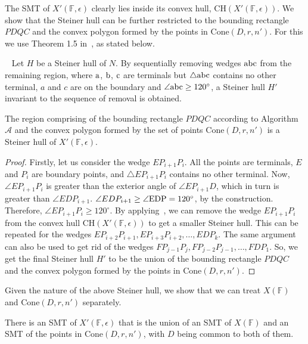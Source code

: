 The SMT of $X'(\mathbb{F},\epsilon)$ clearly lies inside its convex hull, $\mathrm{CH}(X'(\mathbb{F},\epsilon))$. We show that the Steiner hull can be further restricted to the bounding rectangle $PDQC$ and the convex polygon formed by the points in $\mathrm{Cone}(D,r,n')$. For this we use Theorem 1.5 in~\cite{hwang1992steiner}, as stated below.

\begin{proposition}~\cite{hwang1992steiner}\label{thm:steiner_hull}
    Let $H$ be a Steiner hull of $N$. By sequentially removing wedges $\rm abc$ from the remaining region, where $\rm a$, $\rm b$, $\rm c$ are terminals but $\triangle{\rm abc}$ contains no other terminal, $a$ and $c$ are on the boundary and $\angle{\rm abc} \geq 120^\circ$, a Steiner hull $H'$ invariant to the sequence of removal is obtained.
\end{proposition}

\begin{lemma}\label{thm:steiner_hull_regions}
    The region comprising of the bounding rectangle $PDQC$ according to Algorithm $\mathcal{A}$ and the convex polygon formed by the set of points $\mathrm{Cone}(D,r,n')$ is a Steiner hull of $X'(\mathbb{F},\epsilon)$.
\end{lemma}

\begin{proof}
    Firstly, let us consider the wedge $EP_{i+1}P_i$. All the points are terminals, $E$ and $P_i$ are boundary points, and $\triangle{EP_{i+1}P_i}$ contains no other terminal. Now, $\angle{EP_{i+1}P_i}$ is greater than the exterior angle of $\angle{EP_{i+1}D}$, which in turn is greater than $\angle{EDP_{i+1}}$. $\angle{EDP_{i+1}} \geq \angle{\rm EDP} = 120^\circ$, by the construction. Therefore, $\angle{EP_{i+1}P_i} \geq 120^\circ$. By applying~, we can remove the wedge $EP_{i+1}P_i$ from the convex hull $\mathrm{CH}(X'(\mathbb{F},\epsilon))$ to get a smaller Steiner hull. This can be repeated for the wedges $EP_{i+2}P_{i+1}, EP_{i+3}P_{i+2}, \ldots, EDP_k$. The same argument can also be used to get rid of the wedges $FP_{j-1}P_j, FP_{j-2}P_{j-1}, \ldots, FDP_1$. So, we get the final Steiner hull $H'$ to be the union of the bounding rectangle $PDQC$ and the convex polygon formed by the points in $\mathrm{Cone}(D,r,n')$.
\end{proof}

Given the nature of the above Steiner hull, we show that we can treat $X(\mathbb{F})$ and $\mathrm{Cone}(D,r,n')$ separately. 
\begin{lemma}\label{thm:steiner_tree}
    There is an SMT of $X'(\mathbb{F},\epsilon)$ that is the union of an SMT of $X(\mathbb{F})$ and an SMT of the points in $\mathrm{Cone}(D,r,n')$, with $D$ being common to both of them.
\end{lemma}

